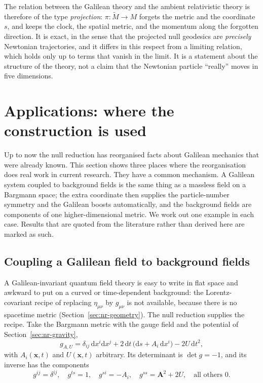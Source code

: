 The relation between the Galilean theory and the ambient relativistic theory
is therefore of the type \emph{projection}: $\pi:\tilde M\to M$ forgets the
metric and the coordinate $s$, and keeps the clock, the spatial metric, and the
momentum along the forgotten direction. It is exact, in the sense that the
projected null geodesics are \emph{precisely} Newtonian trajectories, and it
differs in this respect from a limiting relation, which holds only up to terms
that vanish in the limit. It is a statement about the structure of the theory,
not a claim that the Newtonian particle ``really'' moves in five dimensions.

\section[Applications]{Applications: where the construction is used}
\label{sec:nr-applications}

Up to now the null reduction has reorganised facts about Galilean mechanics
that were already known. This section shows three places where the
reorganisation does real work in current research. They have a common
mechanism. A Galilean system coupled to background fields is the same thing as a
massless field on a Bargmann space; the extra coordinate then supplies
the particle-number symmetry and the Galilean boosts automatically, and the
background fields are components of one higher-dimensional metric. We work out
one example in each case. Results that are quoted from the literature
rather than derived here are marked as such.

\subsection{Coupling a Galilean field to background fields}

A Galilean-invariant quantum field theory is easy to write in flat space and
awkward to put on a curved or time-dependent background: the Lorentz-covariant
recipe of replacing $\eta_{\mu\nu}$ by $g_{\mu\nu}$ is not available, because
there is no spacetime metric (Section~\ref{sec:nr-geometry}). The null reduction
supplies the recipe. Take the Bargmann metric with the gauge field and the
potential of Section~\ref{sec:nr-gravity},
\begin{equation}
  g_{A,U}=\delta_{ij}\,\mathrm{d}x^i\mathrm{d}x^j
  +2\,\mathrm{d}t\,\bigl(\mathrm{d}s+A_i\,\mathrm{d}x^i\bigr)-2U\,\mathrm{d}t^2 ,
  \label{nr:gAU}
\end{equation}
with $A_i(\mathbf{x},t)$ and $U(\mathbf{x},t)$ arbitrary. Its determinant is $\det g=-1$, and its inverse
has the components
\begin{equation}
  g^{ij}=\delta^{ij},\quad g^{ts}=1,\quad g^{si}=-A_i,\quad
  g^{ss}=\mathbf{A}^2+2U,\quad\text{all others }0 .
  \label{nr:ginvAU}
\end{equation}

